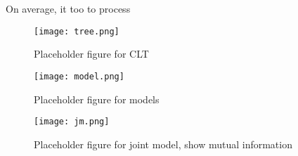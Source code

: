 On average, it too  to process 

\begin{figure}[!t]
  \texttt{[image: tree.png]}
  \caption{Placeholder figure for \ac{CLT}}
\end{figure}

\begin{figure}[!t]
  \texttt{[image: model.png]}
  \caption{Placeholder figure for models}
\end{figure}

\begin{figure}[!t]
  \texttt{[image: jm.png]}
  \caption{Placeholder figure for joint model, show mutual information}
\end{figure}

